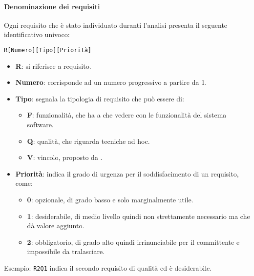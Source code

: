 		\paragraph{Denominazione dei requisiti}\label{PP:Sviluppo:AdR:DenominazioneRequisiti}
		Ogni requisito che è stato individuato duranti l'analisi presenta il seguente identificativo univoco:
		\begin{center}
			\texttt{R[Numero][Tipo][Priorità]}
		\end{center}

		\begin{itemize}
			\item \textbf{R}: si riferisce a requisito.
		 	\item \textbf{Numero}: corrisponde ad un numero progressivo a partire da 1.
		 	\item \textbf{Tipo}: segnala la tipologia di requisito che può essere di:
		 	\begin{itemize}
		 		\item \textbf{F}: funzionalità, che ha a che vedere con le funzionalità del sistema software.
		 		\item \textbf{Q}: qualità, che riguarda tecniche ad hoc.
		 		\item \textbf{V}: vincolo, proposto da \II.
		 	\end{itemize}
	 		\item \textbf{Priorità}: indica il grado di urgenza per il soddisfacimento di un requisito, come:
	 		\begin{itemize}
	 			\item \textbf{0}: opzionale, di grado basso e solo marginalmente utile.
	 			\item \textbf{1}: desiderabile, di medio livello quindi non strettamente necessario ma che dà valore aggiunto.
	 			\item \textbf{2}: obbligatorio, di grado alto quindi irrinunciabile per il committente e impossibile da tralasciare.
	 		\end{itemize}
		\end{itemize}
	
		Esempio: \texttt{R2Q1} indica il secondo requisito di qualità ed è desiderabile.
	

